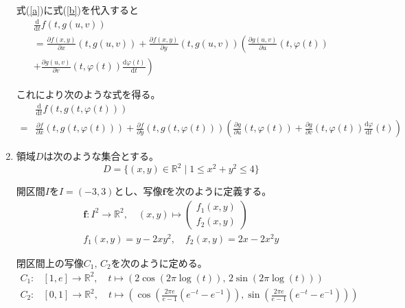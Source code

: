 \documentclass[12pt,b5paper]{ltjsarticle}
\begin{document}
\begin{enumerate}
      式(\ref{a})に式(\ref{b})を代入すると
      \begin{multline}
       \frac{\mathrm{d}}{\mathrm{d}t}f(t,g(u,v))\\
       =
        \frac{\partial f(x,y)}{\partial x}(t,g(u,v))
        + \frac{\partial f(x,y)}{\partial y}(t,g(u,v))
       \left(
       \frac{\partial g(u,v)}{\partial u}(t,\varphi(t)) \right.\\
        + \left.\frac{\partial g(u,v)}{\partial v}(t,\varphi(t))
        \frac{\mathrm{d}\varphi (t)}{\mathrm{d}t}
       \right)
      \end{multline}

      これにより次のような式を得る。
      \begin{align}
       & \frac{\mathrm{d}}{\mathrm{d}t}f(t,g(t,\varphi(t)))\\
       =&
       \frac{\partial f}{\partial x}(t,g(t,\varphi(t)))
        + \frac{\partial f}{\partial y}(t,g(t,\varphi(t)))
       \left(
       \frac{\partial g}{\partial u}(t,\varphi(t))
        + \frac{\partial g}{\partial v}(t,\varphi(t))
        \frac{\mathrm{d}\varphi}{\mathrm{d}t}(t)
       \right)
      \end{align}

      \hrulefill

 \item
      領域$D$は次のような集合とする。
      \begin{equation}
       D = \{ (x,y)\in\mathbb{R}^2 \mid 1\leq x^2 + y^2 \leq 4 \}
      \end{equation}

      開区間$I$を$I=(-3,3)$とし、写像$\bm{f}$を次のように定義する。
      \begin{gather}
       \bm{f}: I^2 \rightarrow \mathbb{R}^2, \quad (x,y)\mapsto
        \begin{pmatrix}f_1(x,y)\\f_2(x,y)\end{pmatrix}\\
       f_1(x,y) = y-2xy^2 , \quad f_2(x,y) = 2x-2x^2y
      \end{gather}

      閉区間上の写像$C_1,\,C_2$を次のように定める。
      \begin{align}
       C_1 :& [1,e] \rightarrow \mathbb{R}^2, \quad
       t \mapsto (2\cos (2\pi \log (t)) , \, 2\sin (2\pi \log (t)))\\
       C_2 :& [0,1] \rightarrow \mathbb{R}^2, \quad
       t\mapsto \left( \cos\left(\frac{2\pi e}{e-1}(e^{-t}-e^{-1})\right),
       \sin\left(\frac{2\pi e}{e-1}(e^{-t}-e^{-1})\right) \right)
      \end{align}


\end{enumerate}
\end{document}
